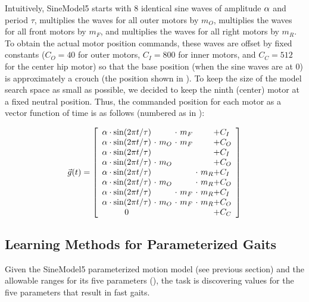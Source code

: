 Intuitively, SineModel5 starts with 8 identical sine waves of
amplitude $\alpha$ and period $\tau$, multiplies the waves for all outer
motors by $m_O$, multiplies the waves for all front motors by $m_F$,
and multiplies the waves for all right motors by $m_R$.  To obtain the
actual motor position commands, these waves are offset by
fixed constants ($C_O = 40$ for outer
motors, $C_I = 800$ for inner motors, and $C_C = 512$ for the center hip motor) so that the base position (when the sine
waves are at 0) is approximately a crouch (the position shown in
).
To keep the size of the model search space as
small as possible, we decided to keep the ninth (center) motor at a fixed neutral
position.
Thus, the commanded position for each motor as a vector function of
time is as follows (numbered as in ):

\[
\vec{g}(t) =
\left[ {\begin{array}{c@{ }c@{ }c@{ }l@{ }l}
\amp \cdot \sin(2\pi t / \tau) & \             & \ \cdot \ m_F & \            & + C_I \\ %
\amp \cdot \sin(2\pi t / \tau) & \ \cdot \ m_O & \ \cdot \ m_F & \            & + C_O \\ %
\amp \cdot \sin(2\pi t / \tau) & \             & \             & \            & + C_I \\ %
\amp \cdot \sin(2\pi t / \tau) & \ \cdot \ m_O & \             & \            & + C_O \\ %
\amp \cdot \sin(2\pi t / \tau) & \             & \             & \ \cdot \ m_R  & + C_I \\ %
\amp \cdot \sin(2\pi t / \tau) & \ \cdot \ m_O & \             & \ \cdot \ m_R  & + C_O \\ %
\amp \cdot \sin(2\pi t / \tau) & \             & \ \cdot \ m_F & \ \cdot \ m_R  & + C_I \\ %
\amp \cdot \sin(2\pi t / \tau) & \ \cdot \ m_O & \ \cdot \ m_F & \ \cdot \ m_R  & + C_O \\ %
0                              & \             & \             & \            & + C_C \\ %
\end{array} } \right]
\]

\subsection{Learning Methods for Parameterized Gaits}

Given the SineModel5 parameterized motion model (see previous section) and the allowable ranges for its five
parameters (), the task is discovering
values for the five parameters that result in fast 
gaits.

